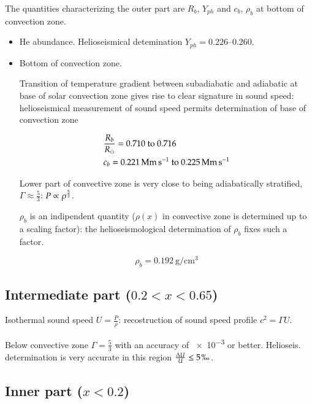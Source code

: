 \documentclass[../main.tex]{subfiles}
\begin{document}
The quantities characterizing the outer part are $R_b$, $Y_{ph}$ and $c_b$, $\rho_b$ at bottom of convection zone.

\begin{itemize}
    \item He abundance. Helioseismical detemination $Y_{ph}=\numrange{0.226}{0.260}$.
    
    \item Bottom of convection zone.
    
    Transition of temperature gradient between subadiabatic and adiabatic at base of solar convection zone gives rise to clear signature in sound speed: helioseismical measurement of sound speed permits determination of base of convection zone
    
    \begin{align*}
    &\frac{R_b}{\rsun{}}=\numrange{0.710}{0.716}\\
    &c_b=\SIrange{0.221}{0.225}{\mega\meter\per\second}
    \end{align*}
    
    Lower part of convective zone is very close to being adiabatically stratified, $\Gamma\approx\frac{5}{3}$: $P\propto\rho^{\frac{5}{3}}$.
    
    $\rho_b$ is an indipendent quantity ($\rho(x)$ in convective zone is determined up to a scaling factor): the helioseismological determination of $\rho_b$ fixes such a factor.
    
    \begin{equation*}
        \rho_b=\SI{0.192}{\gram\per\cubic\cm}
    \end{equation*}
    
\end{itemize}

\subsection{Intermediate part ($0.2<x<0.65$)}

Isothermal sound speed $U=\frac{P}{\rho}$: recostruction of sound speed profile $c^2=\Gamma U$.

Below convective zone $\Gamma=\frac{5}{3}$ with an accuracy of \num{e-3} or better. Helioseis. determination is very accurate in this region $\frac{\Delta U}{U}\leq5 \perthousand$.

\subsection{Inner part ($x<0.2$)}
\end{document}
